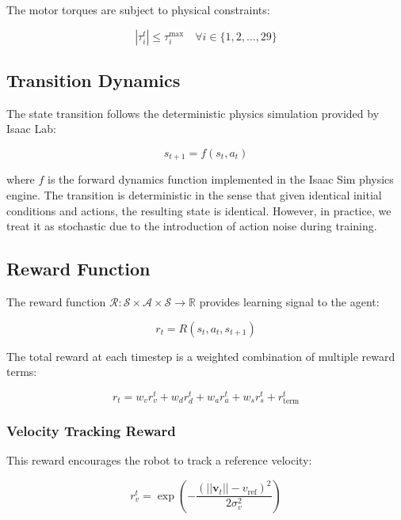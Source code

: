 \documentclass[12pt,a4paper]{article}
\begin{document}
The motor torques are subject to physical constraints:

\begin{equation}
|\tau_i^t| \leq \tau_i^{\max} \quad \forall i \in \{1, 2, \ldots, 29\}
\end{equation}

\subsection{Transition Dynamics}

The state transition follows the deterministic physics simulation provided by Isaac Lab:

\begin{equation}
s_{t+1} = f(s_t, a_t)
\end{equation}

where $f$ is the forward dynamics function implemented in the Isaac Sim physics engine. The transition is deterministic in the sense that given identical initial conditions and actions, the resulting state is identical. However, in practice, we treat it as stochastic due to the introduction of action noise during training.

\subsection{Reward Function}

The reward function $\mathcal{R}: \mathcal{S} \times \mathcal{A} \times \mathcal{S} \to \mathbb{R}$ provides learning signal to the agent:

\begin{equation}
r_t = R(s_t, a_t, s_{t+1})
\end{equation}

The total reward at each timestep is a weighted combination of multiple reward terms:

\begin{equation}
r_t = w_v r_v^t + w_d r_d^t + w_a r_a^t + w_s r_s^t + r_{\text{term}}^t
\end{equation}

\subsubsection{Velocity Tracking Reward}

This reward encourages the robot to track a reference velocity:

\begin{equation}
r_v^t = \exp\left( -\frac{(||\mathbf{v}_t|| - v_{\text{ref}})^2}{2\sigma_v^2} \right)
\end{equation}
\end{document}
